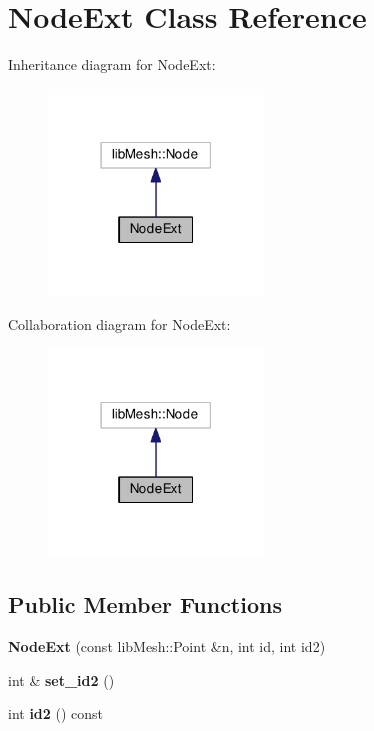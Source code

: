 \hypertarget{class_node_ext}{\section{Node\-Ext Class Reference}
\label{class_node_ext}
}


Inheritance diagram for Node\-Ext\-:\nopagebreak
\begin{figure}[H]
\begin{center}
\leavevmode
\includegraphics[width=162pt]{class_node_ext__inherit__graph}
\end{center}
\end{figure}


Collaboration diagram for Node\-Ext\-:\nopagebreak
\begin{figure}[H]
\begin{center}
\leavevmode
\includegraphics[width=162pt]{class_node_ext__coll__graph}
\end{center}
\end{figure}
\subsection*{Public Member Functions}
\begin{DoxyCompactItemize}
\item 
\hypertarget{class_node_ext_a7077383f48c3c23b8eee43b561f466c1}{{\bfseries Node\-Ext} (const lib\-Mesh\-::\-Point \&n, int id, int id2)}\label{class_node_ext_a7077383f48c3c23b8eee43b561f466c1}

\item 
\hypertarget{class_node_ext_a9c55ed76c5901c4ab499b4e950c4d2ea}{int \& {\bfseries set\-\_\-id2} ()}\label{class_node_ext_a9c55ed76c5901c4ab499b4e950c4d2ea}

\item 
\hypertarget{class_node_ext_ad0a2baff589e7bcefec4487ea494218e}{int {\bfseries id2} () const }\label{class_node_ext_ad0a2baff589e7bcefec4487ea494218e}

\end{DoxyCompactItemize}
